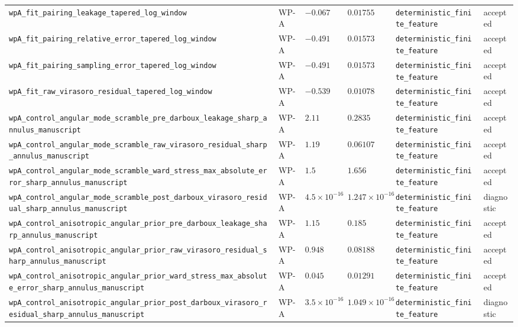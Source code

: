 \begin{table}[t]
\begin{tabular}{@{}llllll@{}}
\texttt{wpA\_fit\_pairing\_leakage\_tapered\_log\_window} & WP-A & $-0.067$ & $0.01755$ & \texttt{deterministic\_finite\_feature} & accepted \\
\texttt{wpA\_fit\_pairing\_relative\_error\_tapered\_log\_window} & WP-A & $-0.491$ & $0.01573$ & \texttt{deterministic\_finite\_feature} & accepted \\
\texttt{wpA\_fit\_pairing\_sampling\_error\_tapered\_log\_window} & WP-A & $-0.491$ & $0.01573$ & \texttt{deterministic\_finite\_feature} & accepted \\
\texttt{wpA\_fit\_raw\_virasoro\_residual\_tapered\_log\_window} & WP-A & $-0.539$ & $0.01078$ & \texttt{deterministic\_finite\_feature} & accepted \\
\texttt{wpA\_control\_angular\_mode\_scramble\_pre\_darboux\_leakage\_sharp\_annulus\_manuscript} & WP-A & $2.11$ & $0.2835$ & \texttt{deterministic\_finite\_feature} & accepted \\
\texttt{wpA\_control\_angular\_mode\_scramble\_raw\_virasoro\_residual\_sharp\_annulus\_manuscript} & WP-A & $1.19$ & $0.06107$ & \texttt{deterministic\_finite\_feature} & accepted \\
\texttt{wpA\_control\_angular\_mode\_scramble\_ward\_stress\_max\_absolute\_error\_sharp\_annulus\_manuscript} & WP-A & $1.5$ & $1.656$ & \texttt{deterministic\_finite\_feature} & accepted \\
\texttt{wpA\_control\_angular\_mode\_scramble\_post\_darboux\_virasoro\_residual\_sharp\_annulus\_manuscript} & WP-A & $4.5\times10^{-16}$ & $1.247\times10^{-16}$ & \texttt{deterministic\_finite\_feature} & diagnostic \\
\texttt{wpA\_control\_anisotropic\_angular\_prior\_pre\_darboux\_leakage\_sharp\_annulus\_manuscript} & WP-A & $1.15$ & $0.185$ & \texttt{deterministic\_finite\_feature} & accepted \\
\texttt{wpA\_control\_anisotropic\_angular\_prior\_raw\_virasoro\_residual\_sharp\_annulus\_manuscript} & WP-A & $0.948$ & $0.08188$ & \texttt{deterministic\_finite\_feature} & accepted \\
\texttt{wpA\_control\_anisotropic\_angular\_prior\_ward\_stress\_max\_absolute\_error\_sharp\_annulus\_manuscript} & WP-A & $0.045$ & $0.01291$ & \texttt{deterministic\_finite\_feature} & accepted \\
\texttt{wpA\_control\_anisotropic\_angular\_prior\_post\_darboux\_virasoro\_residual\_sharp\_annulus\_manuscript} & WP-A & $3.5\times10^{-16}$ & $1.049\times10^{-16}$ & \texttt{deterministic\_finite\_feature} & diagnostic \\

\end{tabular}
\end{table}
